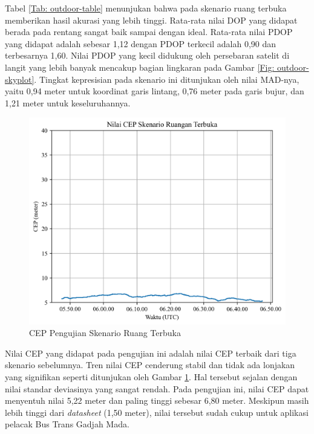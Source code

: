 Tabel \ref{Tab: outdoor-table} menunjukan bahwa pada skenario ruang terbuka memberikan hasil akurasi yang lebih tinggi. Rata-rata nilai DOP yang didapat berada pada rentang sangat baik sampai dengan ideal. Rata-rata nilai PDOP yang didapat adalah sebesar 1,12 dengan PDOP terkecil adalah 0,90 dan terbesarnya 1,60. Nilai PDOP yang kecil didukung oleh persebaran satelit di langit yang lebih banyak mencakup bagian lingkaran pada Gambar \ref{Fig: outdoor-skyplot}. Tingkat kepresisian pada skenario ini ditunjukan oleh nilai MAD-nya, yaitu 0,94 meter untuk koordinat garis lintang, 0,76 meter pada garis bujur, dan 1,21 meter untuk keseluruhannya.

\begin{figure}[H]
	\centering
	\includegraphics[width=13cm]{contents/chapter-4/4-skenario-outdoor/cep.png}
	\caption{CEP Pengujian Skenario Ruang Terbuka}
	\label{Fig: outdoor-cep}
\end{figure}

Nilai CEP yang didapat pada pengujian ini adalah nilai CEP terbaik dari tiga skenario sebelumnya. Tren nilai CEP cenderung stabil dan tidak ada lonjakan yang signifikan seperti ditunjukan oleh Gambar \ref{Fig: outdoor-cep}. Hal tersebut sejalan dengan nilai standar deviasinya yang sangat rendah. Pada pengujian ini, nilai CEP dapat menyentuh nilai 5,22 meter dan paling tinggi sebesar 6,80 meter. Meskipun masih lebih tinggi dari \textit{datasheet} (1,50 meter), nilai tersebut sudah cukup untuk aplikasi pelacak Bus Trans Gadjah Mada.


